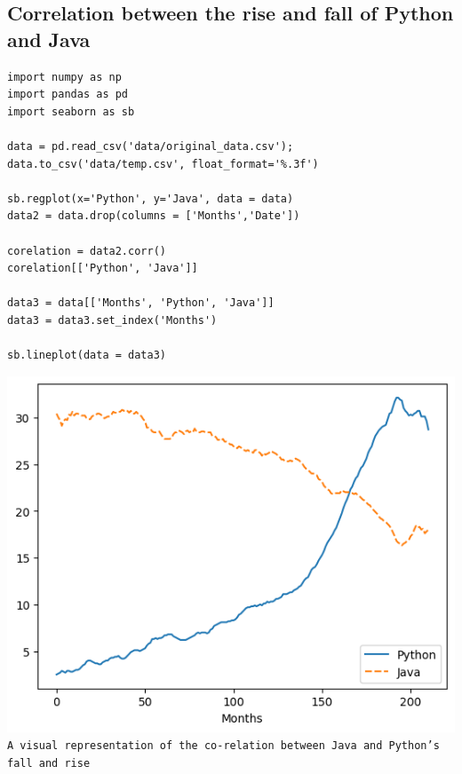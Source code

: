 \documentclass[conference]{IEEEtran}
\begin{document}
\subsection{Correlation between the rise and fall of Python and Java}

\begin{lstlisting}
import numpy as np
import pandas as pd
import seaborn as sb

data = pd.read_csv('data/original_data.csv');
data.to_csv('data/temp.csv', float_format='%.3f')

sb.regplot(x='Python', y='Java', data = data)
data2 = data.drop(columns = ['Months','Date'])

corelation = data2.corr()
corelation[['Python', 'Java']]

data3 = data[['Months', 'Python', 'Java']]
data3 = data3.set_index('Months')

sb.lineplot(data = data3)
\end{lstlisting}

\includegraphics[scale=0.5]{lineplot/java-v-python.png}\\
\texttt{A visual representation of the co-relation between Java and Python's fall and rise}\\
\end{document}
